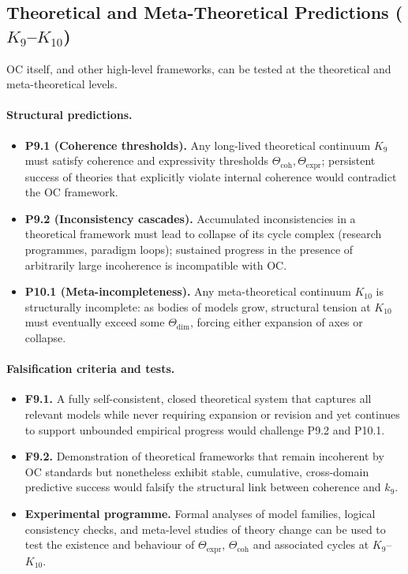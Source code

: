\subsection{Theoretical and Meta-Theoretical Predictions
            (\texorpdfstring{$K_9$}{K9}--\texorpdfstring{$K_{10}$}{K10})}

OC itself, and other high-level frameworks, can be tested at the theoretical
and meta-theoretical levels.

\paragraph{Structural predictions.}
\begin{itemize}
  \item \textbf{P9.1 (Coherence thresholds).}
        Any long-lived theoretical continuum \(K_9\) must satisfy coherence
        and expressivity thresholds
        \(\Theta_{\mathrm{coh}}, \Theta_{\mathrm{expr}}\); persistent
        success of theories that explicitly violate internal coherence
        would contradict the OC framework.
  \item \textbf{P9.2 (Inconsistency cascades).}
        Accumulated inconsistencies in a theoretical framework must lead to
        collapse of its cycle complex (research programmes, paradigm loops);
        sustained progress in the presence of arbitrarily large incoherence
        is incompatible with OC.
  \item \textbf{P10.1 (Meta-incompleteness).}
        Any meta-theoretical continuum \(K_{10}\) is structurally incomplete:
        as bodies of models grow, structural tension at \(K_{10}\) must
        eventually exceed some \(\Theta_{\mathrm{dim}}\), forcing either
        expansion of axes or collapse.
\end{itemize}

\paragraph{Falsification criteria and tests.}
\begin{itemize}
  \item \textbf{F9.1.}
        A fully self-consistent, closed theoretical system that captures
        all relevant models while never requiring expansion or revision and
        yet continues to support unbounded empirical progress would
        challenge P9.2 and P10.1.
  \item \textbf{F9.2.}
        Demonstration of theoretical frameworks that remain incoherent
        by OC standards but nonetheless exhibit stable, cumulative,
        cross-domain predictive success would falsify the structural link
        between coherence and \(k_9\).
  \item \textbf{Experimental programme.}
        Formal analyses of model families, logical consistency checks,
        and meta-level studies of theory change can be used to test the
        existence and behaviour of \(\Theta_{\mathrm{expr}}\),
        \(\Theta_{\mathrm{coh}}\) and associated cycles at \(K_9\)–\(K_{10}\).
\end{itemize}

